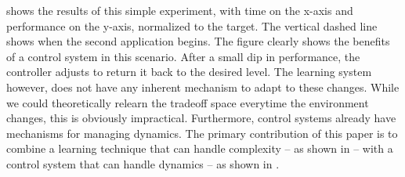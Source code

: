  shows the results of this simple experiment, with
time on the x-axis and performance on the y-axis, normalized to the
target.  The vertical dashed line shows when the second application
begins.  The figure clearly shows the benefits of a control system in
this scenario.  After a small dip in performance, the controller
adjusts to return it back to the desired level.  The learning system
however, does not have any inherent mechanism to adapt to these
changes.  While we could theoretically relearn the tradeoff space
everytime the environment changes, this is obviously impractical.
Furthermore, control systems already have mechanisms for managing
dynamics.  The primary contribution of this paper is to combine a
learning technique that can handle complexity -- as shown in \figref{}
-- with a control system that can handle dynamics -- as shown in
\figref{}. 

